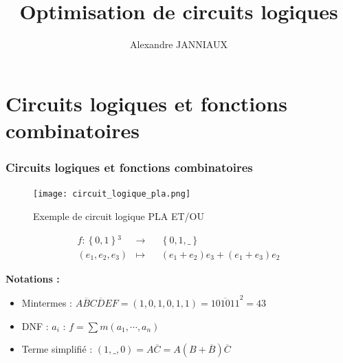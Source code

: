 \documentclass[handout]{beamer}
\title{Optimisation de circuits logiques}
\author{Alexandre JANNIAUX}
\date{}
\newcommand{\lnon}{\overline}
\newcommand{\ensemble}[1]{\left\lbrace{} #1 \right\rbrace{}}
\begin{document}
\begin{frame}
  \maketitle
  \tableofcontents
\end{frame}

\section{Circuits logiques et fonctions combinatoires}
\begin{frame}
  \frametitle{Circuits logiques et fonctions combinatoires}
  \begin{figure}[p]
    \texttt{[image: circuit\_logique\_pla.png]}
    \caption{Exemple de circuit logique PLA ET/OU}
    \label{fig:circ1}
  \end{figure}
  
  \[ \begin{aligned}
    f: \ensemble{0,1}^3 &\longrightarrow && \ensemble{0,1,\_} \\
    (e_1,e_2,e_3) & \longmapsto && (e_1+e_2)e_3 + (e_1+e_3)e_2
  \end{aligned}
  \]

  \textbf{Notations : }
  \begin{itemize}
  \item Mintermes : $A\lnon{B}C\lnon{D}EF = (1,0,1,0,1,1) = \overline{101011}^{2} = 43$
  \item DNF : $a_i$ : $f = \sum m(a_1, \cdots, a_n)$
  \item Terme simplifié : $(1,\_,0) = A\overline{C} = A(B+\overline{B})\overline{C}$
  \end{itemize}
  



  
  \begin{figure}[p]
%    
  \end{figure}
  

  
\end{frame}
\end{document}
